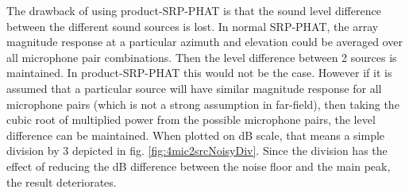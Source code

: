 The drawback of using product-SRP-PHAT is that the sound level difference between the different sound sources is lost. In normal SRP-PHAT, the array magnitude response at a particular azimuth and elevation could be averaged over all microphone pair combinations. Then the level difference between 2 sources is maintained. In product-SRP-PHAT this would not be the case. However if it is assumed that a particular source will have similar magnitude response for all microphone pairs (which is not a strong assumption in far-field), then taking the cubic root of multiplied power from the possible microphone pairs, the level difference can be maintained. When plotted on dB scale, that means a simple division by 3 depicted in fig. \ref{fig:4mic2srcNoisyDiv}. Since the division has the effect of reducing the dB difference between the noise floor and the main peak, the result deteriorates.


